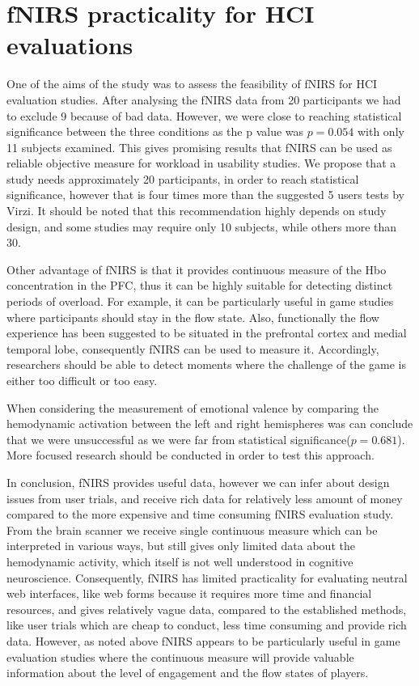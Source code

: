 \documentclass[a4paper]{report}
\begin{document}
	\section{fNIRS practicality for HCI evaluations}
		One of the aims of the study was to assess the feasibility of fNIRS for HCI evaluation studies. After analysing the fNIRS data from 20 participants we had to exclude 9 because of bad data. However, we were close to reaching statistical significance between the three conditions as the p value was $p=0.054$ with only 11 subjects examined. This gives promising results that fNIRS can be used as reliable objective measure for workload in usability studies. We propose that a study needs approximately 20 participants, in order to reach statistical significance, however that is four times more than the suggested 5 users tests by Virzi\cite{virzi1992refining}. It should be noted that this recommendation highly depends on study design, and some studies may require only 10 subjects, while others more than 30.
		
		Other advantage of fNIRS is that it provides continuous measure of the Hbo concentration in the PFC, thus it can be highly suitable for detecting distinct periods of overload. For example, it can be particularly useful in game studies where participants should stay in the flow\cite{nakamura2002concept} state. Also, functionally the flow experience has been suggested to be situated in the prefrontal cortex and medial temporal lobe\cite{dietrich2004neurocognitive}, consequently fNIRS can be used to measure it. Accordingly, researchers should be able to detect moments where the challenge of the game is either too difficult or too easy.
		
		When considering the measurement of emotional valence by comparing the hemodynamic activation between the left and right hemispheres was can conclude that we were unsuccessful as we were far from statistical significance($p=0.681$). More focused research should be conducted in order to test this approach.
		
		In conclusion, fNIRS provides useful data, however we can infer about design issues from user trials, and receive rich data for relatively less amount of money compared to the more expensive and time consuming fNIRS evaluation study. From the brain scanner we receive single continuous measure which can be interpreted in various ways, but still gives only limited data about the hemodynamic activity, which itself is not well understood in cognitive neuroscience. Consequently, fNIRS has limited practicality for evaluating neutral web interfaces, like web forms because it requires more time and financial resources, and gives relatively vague data, compared to the established methods, like user trials which are cheap to conduct, less time consuming and provide rich data. However, as noted above fNIRS appears to be particularly useful in game evaluation studies where the continuous measure will provide valuable information about the level of engagement\cite{harrivel2013monitoring} and the flow states\cite{yoshida2014brain} of players.
\end{document}

